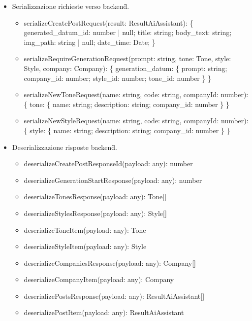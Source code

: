 \documentclass[a4paper,11pt]{article}
\begin{document}
\begin{itemize}[noitemsep, topsep=0pt]
\item Serializzazione richieste verso backend\G{}.
\begin{itemize}[noitemsep, topsep=0pt]
\item serializeCreatePostRequest(result: ResultAiAssistant): \{ generated_datum_id: number | null; title: string; body_text: string; img_path: string | null; date_time: Date; \}
\item serializeRequireGenerationRequest(prompt: string, tone: Tone, style: Style, company: Company): \{ generation_datum: \{ prompt: string; company_id: number; style_id: number; tone_id: number \} \}
\item serializeNewToneRequest(name: string, code: string, companyId: number): \{ tone: \{ name: string; description: string; company_id: number \} \}
\item serializeNewStyleRequest(name: string, code: string, companyId: number): \{ style: \{ name: string; description: string; company_id: number \} \}
\end{itemize}

\item Deserializzazione risposte backend\G{}.
\begin{itemize}[noitemsep, topsep=0pt]
\item deserializeCreatePostResponseId(payload: any): number
\item deserializeGenerationStartResponse(payload: any): number
\item deserializeTonesResponse(payload: any): Tone[]
\item deserializeStylesResponse(payload: any): Style[]
\item deserializeToneItem(payload: any): Tone
\item deserializeStyleItem(payload: any): Style
\item deserializeCompaniesResponse(payload: any): Company[]
\item deserializeCompanyItem(payload: any): Company
\item deserializePostsResponse(payload: any): ResultAiAssistant[]
\item deserializePostItem(payload: any): ResultAiAssistant
\end{itemize}


\end{itemize}
\end{document}
